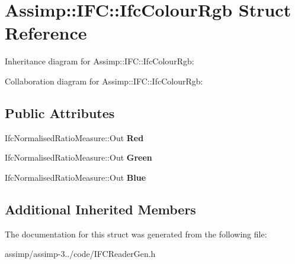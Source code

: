\hypertarget{struct_assimp_1_1_i_f_c_1_1_ifc_colour_rgb}{\section{Assimp\+:\+:I\+F\+C\+:\+:Ifc\+Colour\+Rgb Struct Reference}
\label{struct_assimp_1_1_i_f_c_1_1_ifc_colour_rgb}
}


Inheritance diagram for Assimp\+:\+:I\+F\+C\+:\+:Ifc\+Colour\+Rgb\+:


Collaboration diagram for Assimp\+:\+:I\+F\+C\+:\+:Ifc\+Colour\+Rgb\+:
\subsection*{Public Attributes}
\begin{DoxyCompactItemize}
\item 
\hypertarget{struct_assimp_1_1_i_f_c_1_1_ifc_colour_rgb_abd1197071da9bfe93a611b3b6f7e13ba}{Ifc\+Normalised\+Ratio\+Measure\+::\+Out {\bfseries Red}}\label{struct_assimp_1_1_i_f_c_1_1_ifc_colour_rgb_abd1197071da9bfe93a611b3b6f7e13ba}

\item 
\hypertarget{struct_assimp_1_1_i_f_c_1_1_ifc_colour_rgb_a52a386b100ab9e5d4313e632adf92d35}{Ifc\+Normalised\+Ratio\+Measure\+::\+Out {\bfseries Green}}\label{struct_assimp_1_1_i_f_c_1_1_ifc_colour_rgb_a52a386b100ab9e5d4313e632adf92d35}

\item 
\hypertarget{struct_assimp_1_1_i_f_c_1_1_ifc_colour_rgb_af6932b6cdb575a6c190a5b994de23039}{Ifc\+Normalised\+Ratio\+Measure\+::\+Out {\bfseries Blue}}\label{struct_assimp_1_1_i_f_c_1_1_ifc_colour_rgb_af6932b6cdb575a6c190a5b994de23039}

\end{DoxyCompactItemize}
\subsection*{Additional Inherited Members}


The documentation for this struct was generated from the following file\+:\begin{DoxyCompactItemize}
\item 
assimp/assimp-\/3../code/I\+F\+C\+Reader\+Gen.\+h\end{DoxyCompactItemize}
